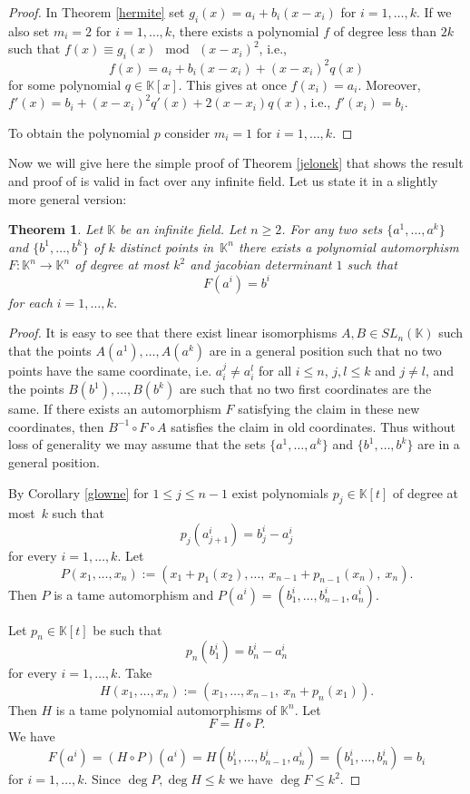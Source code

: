\documentclass{amsart}
\newtheorem{theorem}{Theorem}[section]
\newcommand{\K}{\mathbb{K}}
\begin{document}
\begin{proof}
In Theorem \ref{hermite} set  $g_i(x)=a_i+b_i(x-x_i)$ for $ i=1,\ldots, k$. If we also set $m_i=2$ for $ i=1,\ldots, k$, there exists a polynomial $f$ of degree less than $2k$ such that
$f(x)\equiv g_{i}(x) \mod \,(x-x_{i})^{2}$, i.e., $$f(x)=a_i+b_i(x-x_i)+(x-x_i)^2q(x)$$ 
for some polynomial $q\in \K[x]$.  This gives at once $f(x_i)=a_i.$
Moreover, $f'(x)=b_i+(x-x_i)^2q'(x)+2(x-x_i)q(x)$, i.e., $f'(x_i)=b_i.$ 

To obtain the polynomial $p$ consider $m_i=1$ for $ i=1,\ldots, k$.
\end{proof}


Now we will give here the simple proof 
 of Theorem \ref{jelonek} that shows the result and proof of \cite{jel} is valid in fact over any infinite field. Let us state it in a slightly more general version:

\begin{theorem}\label{thm:pointautomorphism}
Let $\K$ be an infinite field. Let $n\ge 2$. 
For any two sets   $\{a^1,\ldots,a^k\}$ and $\{b^1,\ldots,b^k\}$  of $k$ distinct points in~$\K^n$ there exists a polynomial automorphism $F:\K^n \to \K^n$ of degree at most $k^2$ and jacobian determinant $1$ such that
$$ F(a^i) = b^i $$
for each $i=1,\dots,k$.
\end{theorem}


\begin{proof}

It is easy to see that there exist linear isomorphisms $A,B\in SL_n(\K)$ such that the points $A(a^1),\dots, A(a^k)$  are in a general position such that no two points have the same coordinate, i.e.  $a_i^j\neq a_i^l$ for all $i\leq n$, $j, l\leq k$ and $j\neq l$, and the points $B(b^1),\dots,B(b^k)$ are such that no two first coordinates are the same. If there exists an automorphism $F$ satisfying the claim in these new coordinates, then $B^{-1}\circ F\circ A$ satisfies the claim in old coordinates. Thus without loss of generality we may assume that the sets  $\{a^1,\ldots,a^k\}$ and $\{b^1,\ldots,b^k\}$ are in a general position.

By Corollary \ref{glowne} for $1\leq j \leq n-1$ exist polynomials $p_j\in \K[t]$ of degree at most~$k$  such that 
$$p_j(a^{i}_{j+1})=b^{i}_{j}-a^{i}_{j}$$
for every $i=1,\dots, k$.
Let
$$P(x_1,\dots, x_n):=(x_1+p_{1}(x_{2}),\dots,\ x_{n-1}+p_{n-1}(x_{n}),\ x_n).$$
Then $P$ is a tame automorphism and $P(a^i)=(b^{i}_{1},\dots, b^{i}_{n-1}, a^{i}_{n}).$


Let $p_n\in\K[t]$ be such that 
$$p_n(b^{i}_{1})=b^{i}_{n}-a^{i}_{n}$$
for every $i=1,\dots,k$. 
Take
$$H(x_1,\dots,x_n):=(x_1,\dots,x_{n-1},\ x_n+p_n(x_1)).$$
Then  $H$ is a tame polynomial automorphisms of $\K^n.$ Let $$F=  H\circ P.$$ 
We have
$$F(a^i)=  (H\circ P)(a^i)=H(b^{i}_{1},\dots, b^{i}_{n-1}, a^{i}_{n})=(b^{i}_{1},\dots, b^{i}_{n})=b_i $$
 for $i=1,\dots, k.$ Since $\deg P, \deg H\le k$ we have $\deg F\le k^2.$
\end{proof}
\end{document}
